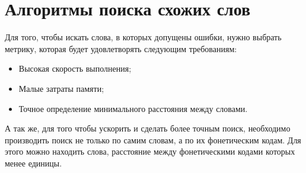 \section{Алгоритмы поиска схожих слов}

Для того, чтобы искать слова, в которых допущены ошибки, нужно выбрать метрику, которая будет удовлетворять следующим требованиям: 

\begin{itemize}
  \item Высокая скорость выполнения;
  \item Малые затраты памяти;
  \item Точное определение минимального расстояния между словами.
\end{itemize}

А так же, для того чтобы ускорить и сделать более точным поиск, необходимо производить поиск не только по самим словам, а по их фонетическим кодам. Для этого можно находить слова, расстояние между фонетическими кодами которых менее единицы.



